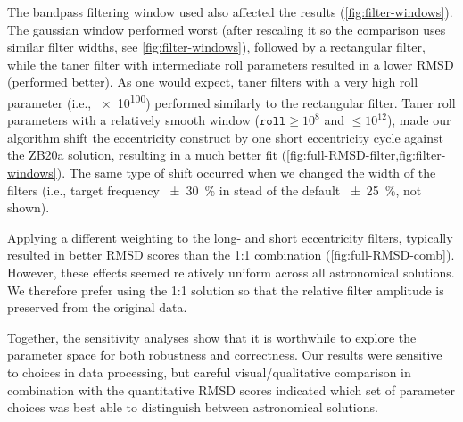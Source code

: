 \documentclass[draft]{agujournal2019}
\newcommand{\rez}{\textcolor{magenta}}
\newcommand{\ijk}{\textcolor{blue}}
\begin{document}
The bandpass filtering window used also affected the results (\cref{fig:filter-windows}).
The gaussian window performed worst (after rescaling it so the comparison uses similar filter widths, see \cref{fig:filter-windows}), followed by a rectangular filter, while the taner filter with intermediate roll parameters resulted in a lower \gls{RMSD} (performed better).
As one would expect, taner filters with a very high roll parameter (i.e., \num{e100}) performed similarly to the rectangular filter.
Taner roll parameters with a relatively smooth window (\(\texttt{roll} \ge 10^{8}\) and \(\le 10^{12}\)), made our algorithm shift the eccentricity construct by one short eccentricity cycle against the ZB20a solution, resulting in a much better fit (\cref{fig:full-RMSD-filter,fig:filter-windows}).
The same type of shift occurred when we changed the width of the filters (i.e., target frequency \qty{\pm30}{\percent} in stead of the default \qty{\pm25}{\percent}, not shown).

Applying a different weighting to the long- and short eccentricity filters, typically resulted in better \gls{RMSD} scores than the 1:1 combination (\cref{fig:full-RMSD-comb}).
However, these effects seemed relatively uniform across all astronomical solutions.
We therefore prefer using the 1:1 solution so that the relative filter amplitude is preserved from the original data.

Together, the sensitivity analyses show that it is worthwhile to explore the parameter space for both robustness and correctness.
Our results were sensitive to choices in data processing, but careful visual/qualitative comparison in combination with the quantitative \gls{RMSD} scores indicated which set of parameter choices was best able to distinguish between astronomical solutions.
\end{document}
